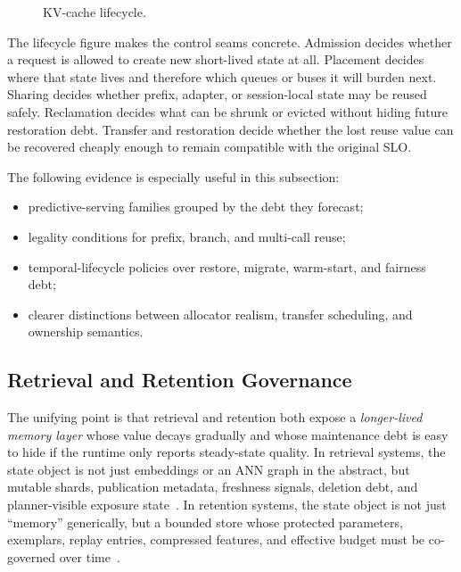 \begin{figure}[t]
\centering
\resizebox{0.94\textwidth}{!}{}
\caption{KV-cache lifecycle.}
\label{fig:supp-kvcache-lifecycle}
\end{figure}

The lifecycle figure makes the control seams concrete. Admission decides whether a request is allowed to create new short-lived state at all. Placement decides where that state lives and therefore which queues or buses it will burden next. Sharing decides whether prefix, adapter, or session-local state may be reused safely. Reclamation decides what can be shrunk or evicted without hiding future restoration debt. Transfer and restoration decide whether the lost reuse value can be recovered cheaply enough to remain compatible with the original SLO.

The following evidence is especially useful in this subsection:
\begin{itemize}[leftmargin=*]
\item predictive-serving families grouped by the debt they forecast;
\item legality conditions for prefix, branch, and multi-call reuse;
\item temporal-lifecycle policies over restore, migrate, warm-start, and fairness debt;
\item clearer distinctions between allocator realism, transfer scheduling, and ownership semantics.
\end{itemize}

\subsection{Retrieval and Retention Governance}

The unifying point is that retrieval and retention both expose a \emph{longer-lived memory layer} whose value decays gradually and whose maintenance debt is easy to hide if the runtime only reports steady-state quality. In retrieval systems, the state object is not just embeddings or an ANN graph in the abstract, but mutable shards, publication metadata, freshness signals, deletion debt, and planner-visible exposure state~\cite{singh2021freshdiskann,wang2021milvus,guo2022manu,asai2024selfrag,zhang2026flowrag,wang2026candor}. In retention systems, the state object is not just ``memory'' generically, but a bounded store whose protected parameters, exemplars, replay entries, compressed features, and effective budget must be co-governed over time~\cite{kirkpatrick2017ewc,rebuffi2017icarl,aljundi2019mir,prabhu2020gdumb,hayes2020remind,zhou2025ferret,li2026streamfp}.

